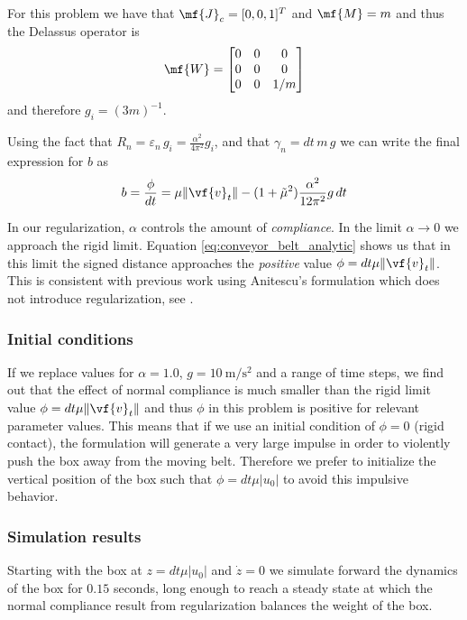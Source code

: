 For this problem we have that $\mf{J}_c=[0, 0, 1]^T$ and $\mf{M}=m$ and thus the
Delassus operator is
\begin{equation}
	\mf{W} = \begin{bmatrix}
		0 & 0 & 0\\
		0 & 0 & 0\\
		0 & 0 & 1/m\\
		\end{bmatrix}
\end{equation}
and therefore $g_i=(3m)^{-1}$.

Using the fact that $R_n=\varepsilon_n\,g_i = \frac{\alpha^2}{4\pi^2}g_i$, and
that $\gamma_n=dt\,m\,g$ we can write the final expression for $b$ as
\begin{eqnarray}
	b=\frac{\phi}{dt}=\mu\Vert\vf{v}_t\Vert-(1+\tilde\mu^2)\frac{\alpha^2}{12\pi^2}g\,dt
	\label{eq:conveyor_belt_analytic}
\end{eqnarray}

In our regularization, $\alpha$ controls the amount of \textit{compliance}. In
the limit $\alpha\rightarrow 0$ we approach the rigid limit. Equation
\ref{eq:conveyor_belt_analytic} shows us that in this limit the signed distance
approaches the \textit{positive} value $\phi = dt\mu\Vert\vf{v}_t\Vert$. This is
consistent with previous work using Anitescu's formulation which does not
introduce regularization, see \cite{bib:anitescu2006, bib:mazhar2014}.

\subsubsection{Initial conditions}
If we replace values for $\alpha=1.0$, $g=10~\text{m}/\text{s}^2$ and a range of
time steps, we find out that the effect of normal compliance is much smaller
than the rigid limit value $\phi = dt\mu\Vert\vf{v}_t\Vert$ and thus $\phi$ in
this problem is positive for relevant parameter values. This means that if we
use an initial condition of $\phi=0$ (rigid contact), the formulation will
generate a very large impulse in order to violently push the box away from the
moving belt. Therefore we prefer to initialize the vertical position of the box
such that $\phi = dt\mu|u_0|$ to avoid this impulsive behavior.

\subsubsection{Simulation results}

Starting with the box at $z=dt\mu|u_0|$ and $\dot{z}=0$ we simulate forward the
dynamics of the box for $0.15$ seconds, long enough to reach a steady state at
which the normal compliance result from regularization balances the weight of
the box.

